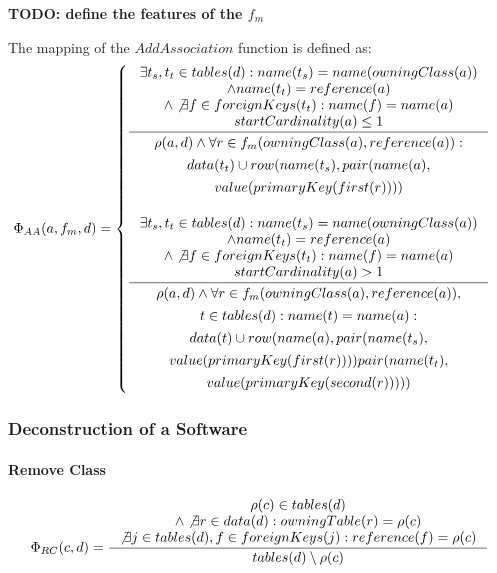 \documentclass[11pt]{article}
\begin{document}
\textbf{TODO: define the features of the $f_m$}

The mapping of the $AddAssociation$ function is defined as:
$$
\Phi_{AA}(a, f_m, d) = \begin{cases}
\inference{ \exists t_s, t_t \in tables(d) : name(t_s) = name(owningClass(a)) \\ \wedge name(t_t) = reference(a) \\ \wedge \not \exists f \in foreignKeys(t_t) : name(f) = name(a) \\ startCardinality(a) \leq 1}{\begin{gathered}
\rho(a,d) \wedge \forall r \in f_m(owningClass(a), reference(a)) : \\ data(t_t) \cup row(name(t_s), pair(name(a), \\ value(primaryKey(first(r)))) 
\end{gathered}
 }
 \\ \\
\inference{ \exists t_s, t_t \in tables(d) : name(t_s) = name(owningClass(a)) \\ \wedge name(t_t) = reference(a) \\ \wedge \not \exists f \in foreignKeys(t_t) : name(f) = name(a) \\ startCardinality(a) > 1}{\begin{gathered}
\rho(a,d) \wedge \forall r \in f_m(owningClass(a), reference(a)),\\ t \in tables(d) : name(t) = name(a) : \\ data(t) \cup row(name(a), pair(name(t_s), \\ value(primaryKey(first(r)))) pair(name(t_t), \\ value(primaryKey(second(r)))))
\end{gathered}
 } 
 
 \end{cases}
$$

\subsubsection{Deconstruction of a Software}
\paragraph{Remove Class}
$$
\Phi_{RC}(c,d) = \inference{ \rho(c) \in tables(d) \\ \wedge \not \exists r \in data(d) : owningTable(r) = \rho(c) \\ \not \exists j \in tables(d), f \in foreignKeys(j) : reference(f) = \rho(c)  }{ tables(d) \setminus \rho(c)}
$$
\end{document}
